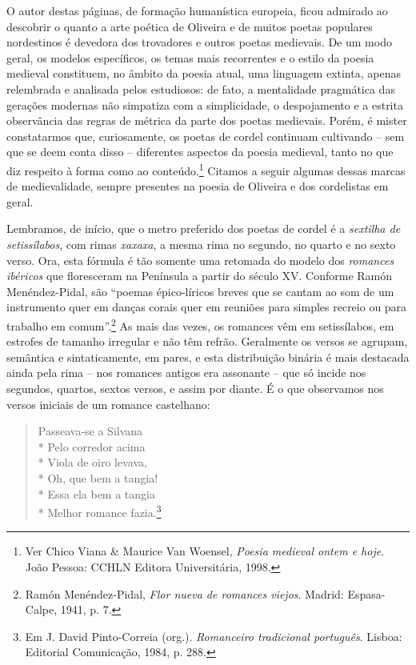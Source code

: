 O autor destas páginas, de formação humanística
europeia, ficou admirado ao descobrir o quanto a arte poética
de Oliveira e de muitos poetas populares nordestinos é
devedora dos trovadores e outros poetas medievais. De um
modo geral, os modelos específicos, os temas mais recorrentes
e o estilo da poesia medieval constituem, no âmbito da poesia
atual, uma linguagem extinta, apenas relembrada e
analisada pelos estudiosos: de fato, a mentalidade pragmática
das gerações modernas não simpatiza com a simplicidade, o
despojamento e a estrita observância das regras de métrica
da parte dos poetas medievais. Porém, é mister constatarmos
que, curiosamente, os poetas de cordel continuam cultivando
{}-- sem que se deem conta disso -- diferentes aspectos da
poesia medieval, tanto no que diz respeito à forma como ao
conteúdo.\footnote{ Ver Chico Viana \& Maurice Van Woensel, \textit{Poesia
medieval ontem e hoje}. João Pessoa: CCHLN Editora
Universitária, 1998.} Citamos a seguir algumas dessas marcas de
medievalidade, sempre presentes na poesia de Oliveira e
dos cordelistas em geral.

\asterisc

Lembramos, de início, que o metro preferido dos poetas
de cordel é a \textit{sextilha de setissílabos}, com rimas \textit{xaxaxa}, a
mesma rima no segundo, no quarto e no sexto verso. Ora,
esta fórmula é tão somente uma retomada do modelo dos
\textit{romances ibéricos} que floresceram na Península a partir
do século XV. Conforme Ramón Menéndez-Pidal, são
``poemas épico-líricos breves que se cantam ao som de um
instrumento quer em danças corais quer em reuniões para
simples recreio ou para trabalho em comum''.\footnote{ Ramón
Menéndez-Pidal, \textit{Flor nueva de romances viejos}. Madrid:
Espasa-Calpe, 1941, p. 7.} As mais
das vezes, os romances vêm em setissílabos, em estrofes de
tamanho irregular e não têm refrão. Geralmente os versos
se agrupam, semântica e sintaticamente, em pares, e esta
distribuição binária é mais destacada ainda pela rima --
nos romances antigos era assonante -- que só incide nos
segundos, quartos, sextos versos, e assim por
diante. É o que observamos nos versos iniciais de um romance
castelhano:

\begin{verse}

Passeava-se a Silvana\\*
Pelo corredor acima\\*
Viola de oiro levava,\\*
Oh, que bem a tangia!\\*
Essa ela bem a tangia\\*
Melhor romance fazia.\footnote{ Em J. David Pinto-Correia (org.).
\textit{Romanceiro tradicional português}. Lisboa: Editorial
Comunicação, 1984, p. 288.}

\end{verse}

